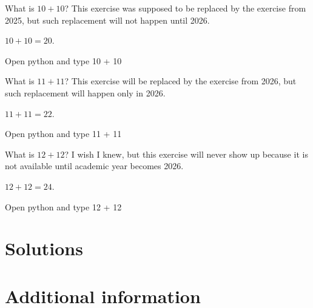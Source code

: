 \documentclass{book}
\begin{document}
\begin{exercise}[examdate={January 16, 2024}, examproblemnumber={1}, examproblemid={2024-01-16-01}, replacedbyexamproblemid={2023-01-16-01}, replacementsinceacademicyear={2026/2027}]
  What is \(10 + 10\)? This exercise was supposed to be replaced by the exercise from 2025, but such replacement will not happen until 2026.
\end{exercise}

\begin{solution}
  \(10 + 10 = 20\).
\end{solution}

\begin{additionalinformation}
Open python and type 10 + 10
\end{additionalinformation}

\begin{exercise}[examdate={January 16, 2025}, examproblemnumber={1}, examproblemid={2025-01-16-01}, replacedbyexamproblemid={2026-01-16-01}, replacementsinceacademicyear={2026/2027}]
  What is \(11 + 11\)? This exercise will be replaced by the exercise from 2026, but such replacement will happen only in 2026.
\end{exercise}

\begin{solution}
  \(11 + 11 = 22\).
\end{solution}

\begin{additionalinformation}
Open python and type 11 + 11
\end{additionalinformation}

\begin{exercise}[examdate={January 16, 2026}, examproblemnumber={1}, examproblemid={2026-01-16-01}]
  What is \(12 + 12\)? I wish I knew, but this exercise will never show up because it is not available until academic year becomes 2026.
\end{exercise}

\begin{solution}
  \(12 + 12 = 24\).
\end{solution}

\begin{additionalinformation}
Open python and type 12 + 12
\end{additionalinformation}

\chapter{Solutions}

\chapter{Additional information}

\SaveReplacements
\end{document}
